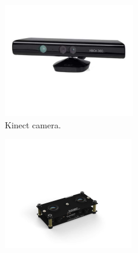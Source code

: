 \begin{figure}[H]
    \centering
    \begin{subfigure}[H]{0.4\linewidth}
        \centering
        \includegraphics[width=\linewidth]{assets/2_15_a.png}
        \caption{{Kinect camera.}}
        \label{fig:2.15a}
    \end{subfigure}
    \begin{subfigure}[H]{0.4\linewidth}
        \centering
        \includegraphics[width=\linewidth]{assets/2_15_b.png}

\end{subfigure}
\end{figure}
